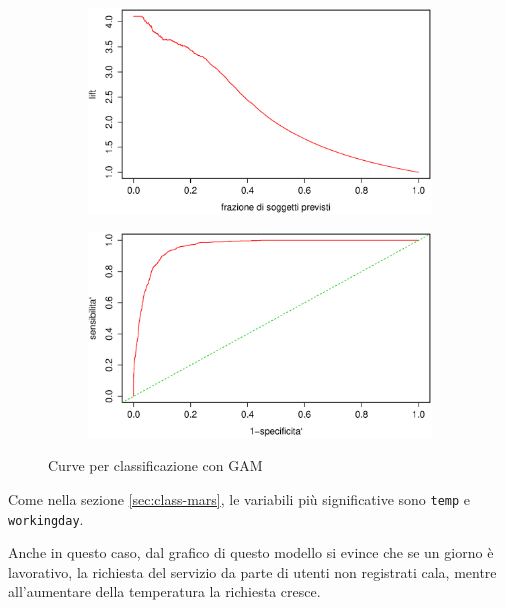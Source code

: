 \begin{figure}[H]
  \begin{subfigure}{0.4\textwidth}
    \includegraphics[width=\columnwidth]{images/class/lift-gam.eps}
  \end{subfigure}
  \hspace*{\fill}
  \begin{subfigure}{0.4\textwidth}
    \includegraphics[width=\columnwidth]{images/class/roc-gam.eps}
  \end{subfigure}
  \caption{Curve per classificazione con GAM}
  \label{fig:class-gam}
\end{figure}

Come nella sezione \ref{sec:class-mars}, le variabili più significative sono
\texttt{temp} e \texttt{workingday}.

Anche in questo caso, dal grafico di questo modello si evince che se un giorno
è lavorativo, la richiesta del servizio da parte di utenti non registrati
cala, mentre all'aumentare della temperatura la richiesta cresce.

